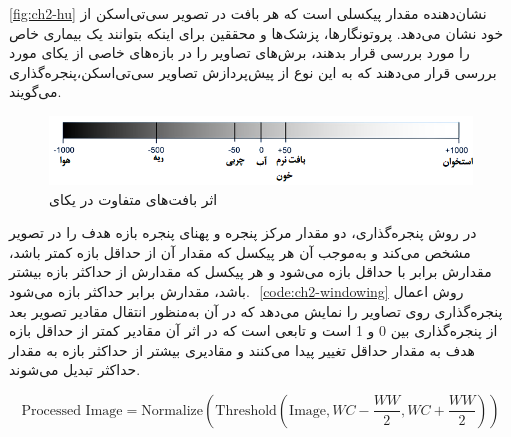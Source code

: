 \autoref{fig:ch2-hu}
نشان‌دهنده مقدار پیکسلی است که هر بافت در تصویر سی‌تی‌اسکن از خود نشان می‌دهد. پروتونگارها،‌ پزشک‌ها و محققین برای اینکه بتوانند یک بیماری خاص را مورد بررسی قرار بدهند، برش‌های تصاویر را در بازه‌های خاصی از یکای
مورد بررسی قرار می‌دهند که به این نوع از پیش‌پردازش تصاویر سی‌تی‌اسکن،‌پنجره‌گذاری
می‌گویند. 
\begin{figure}[H]
\centering
\includegraphics[width=1.0\linewidth]{Images/Chapter2/HU}
\caption{اثر بافت‌های متفاوت در یکای
 \cite{kaggleCTScansDICOM}}
\label{fig:ch2-hu}
\end{figure}

در روش پنجره‌گذاری، دو مقدار مرکز پنجره
و پهنای پنجره
بازه هدف را در تصویر مشخص می‌کند و به‌موجب آن هر پیکسل که مقدار آن از حداقل بازه کمتر باشد، مقدارش برابر با حداقل بازه می‌شود و هر پیکسل که مقدارش از حداکثر بازه بیشتر باشد، مقدارش برابر حداکثر بازه می‌شود. ‎
\autoref{code:ch2-windowing}
روش اعمال پنجره‌گذاری روی تصاویر را نمایش می‌دهد که در آن 
به‌منظور انتقال مقادیر تصویر بعد از پنجره‌گذاری بین 0 و 1 است و 
تابعی است که در اثر آن مقادیر کمتر از حداقل بازه هدف به مقدار حداقل تغییر پیدا می‌کنند و مقادیری بیشتر از حداکثر بازه به مقدار حداکثر تبدیل می‌شوند.   
\begin{latin}
\begin{equation}
\text{Processed Image} = \text{Normalize}(\text{Threshold}(\text{Image}, WC-\frac{WW}{2},WC+\frac{WW}{2})) 
\end{equation}
\label{code:ch2-windowing}
\end{latin}

